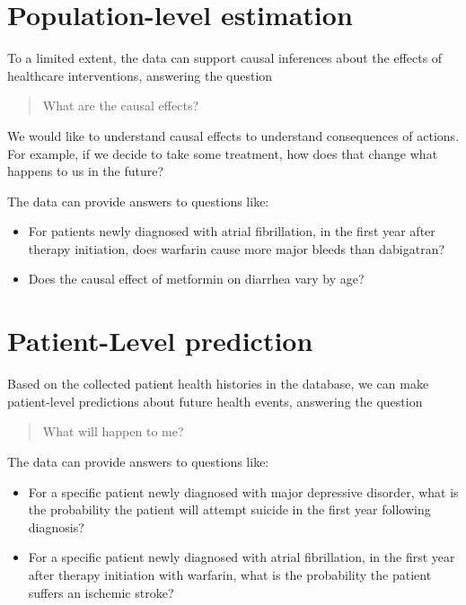 \documentclass[11pt]{book}
\providecommand{\tightlist}{%
  \setlength{\itemsep}{0pt}\setlength{\parskip}{0pt}}
\begin{document}
\section{Population-level estimation}\label{population-level-estimation}

To a limited extent, the data can support causal inferences about the
effects of healthcare interventions, answering the question

\begin{quote}
What are the causal effects?
\end{quote}

We would like to understand causal effects to understand consequences of
actions. For example, if we decide to take some treatment, how does that
change what happens to us in the future?

The data can provide answers to questions like:

\begin{itemize}
\tightlist
\item
  For patients newly diagnosed with atrial fibrillation, in the first
  year after therapy initiation, does warfarin cause more major bleeds
  than dabigatran?
\item
  Does the causal effect of metformin on diarrhea vary by age?
\end{itemize}

\section{Patient-Level prediction}\label{patient-level-prediction}

Based on the collected patient health histories in the database, we can
make patient-level predictions about future health events, answering the
question

\begin{quote}
What will happen to me?
\end{quote}

The data can provide answers to questions like:

\begin{itemize}
\tightlist
\item
  For a specific patient newly diagnosed with major depressive disorder,
  what is the probability the patient will attempt suicide in the first
  year following diagnosis?
\item
  For a specific patient newly diagnosed with atrial fibrillation, in
  the first year after therapy initiation with warfarin, what is the
  probability the patient suffers an ischemic stroke?
\end{itemize}
\end{document}
